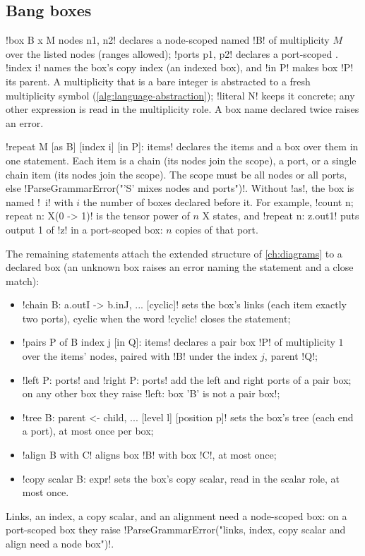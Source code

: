 \subsection{Bang boxes}\label{sec:language-dsl-boxes}

\code!box B x M nodes n1, n2! declares a node-scoped \bbox{} named \code!B! of multiplicity $M$ over the listed nodes (ranges allowed); \code!ports p1, p2! declares a port-scoped \bbox{}. \code!index i! names the box's copy index (an indexed box), and \code!in P! makes box \code!P! its parent. A multiplicity that is a bare integer is abstracted to a fresh multiplicity symbol (\cref{alg:language-abstraction}); \code!literal N! keeps it concrete; any other expression is read in the multiplicity role. A box name declared twice raises an error.

\code!repeat M [as B] [index i] [in P]: items! declares the items and a box over them in one statement. Each item is a chain (its nodes join the scope), a port, or a single chain item (its nodes join the scope). The scope must be all nodes or all ports, else \code!ParseGrammarError("'S' mixes nodes and ports")!. Without \code!as!, the box is named \code!~i! with $i$ the number of boxes declared before it. For example, \code!count n; repeat n: X(0 -> 1)! is the tensor power of $n$ X states, and \code!repeat n: z.out1! puts output 1 of \code!z! in a port-scoped box: $n$ copies of that port.

The remaining statements attach the extended structure of \cref{ch:diagrams} to a declared box (an unknown box raises an error naming the statement and a close match):
\begin{itemize}
\item \code!chain B: a.outI -> b.inJ, ... [cyclic]! sets the box's links (each item exactly two ports), cyclic when the word \code!cyclic! closes the statement;
\item \code!pairs P of B index j [in Q]: items! declares a pair box \code!P! of multiplicity $1$ over the items' nodes, paired with \code!B! under the index $j$, parent \code!Q!;
\item \code!left P: ports! and \code!right P: ports! add the left and right ports of a pair box; on any other box they raise \code!left: box 'B' is not a pair box!;
\item \code!tree B: parent <- child, ... [level l] [position p]! sets the box's tree (each end a port), at most once per box;
\item \code!align B with C! aligns box \code!B! with box \code!C!, at most once;
\item \code!copy scalar B: expr! sets the box's copy scalar, read in the scalar role, at most once.
\end{itemize}
Links, an index, a copy scalar, and an alignment need a node-scoped box: on a port-scoped box they raise \code!ParseGrammarError("links, index, copy scalar and align need a node box")!.

